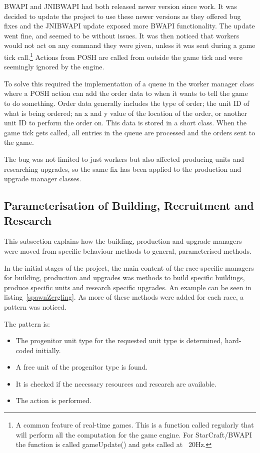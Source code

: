 \documentclass[11pt,openright,a4paper]{report}
\begin{document}
BWAPI and JNIBWAPI had both released newer version since  work. It was decided to update the project to use these newer versions as they offered bug fixes and the JNIBWAPI update exposed more BWAPI functionality. The update went fine, and seemed to be without issues. It was then noticed that workers would not act on any command they were given, unless it was sent during a game tick call.\footnote{A common feature of real-time games. This is a function called regularly that will perform all the computation for the game engine. For StarCraft/BWAPI the function is called gameUpdate() and gets called at ~20Hz.} Actions from POSH are called from outside the game tick and were seemingly ignored by the engine.

To solve this required the implementation of a queue in the worker manager class where a POSH action can add the order data to when it wants to tell the game to do something. Order data generally includes the type of order; the unit ID of what is being ordered; an x and y value of the location of the order, or another unit ID to perform the order on. This data is stored in a short class. When the game tick gets called, all entries in the queue are processed and the orders sent to the game.

The bug was not limited to just workers but also affected producing units and researching upgrades, so the same fix has been applied to the production and upgrade manager classes.


\subsection{Parameterisation of Building, Recruitment and Research}
This subsection explains how the building, production and upgrade managers were moved from specific behaviour methods to general, parameterised methods.

In the initial stages of the project, the main content of the race-specific managers for building, production and upgrades was methods to build specific buildings, produce specific units and research specific upgrades. An example can be seen in listing~\ref{spawnZergling}. As more of these methods were added for each race, a pattern was noticed.

The pattern is:
\begin{itemize}
\item{The progenitor unit type for the requested unit type is determined, hard-coded initially.}
\item{A free unit of the progenitor type is found.}
\item{It is checked if the necessary resources and research are available.}
\item{The action is performed.}
\end{itemize}
\end{document}
